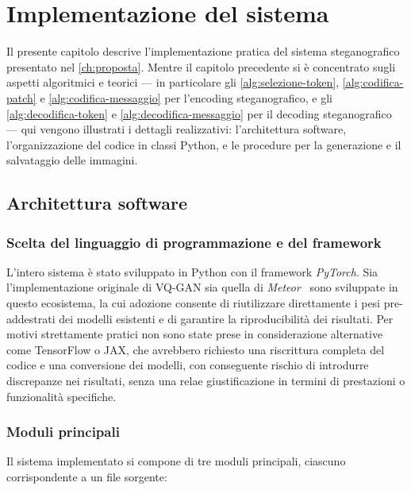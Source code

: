 
\chapter{Implementazione del sistema}
\label{ch:implementazione}

Il presente capitolo descrive l'implementazione pratica del sistema steganografico presentato nel \autoref{ch:proposta}. Mentre il capitolo precedente si è concentrato sugli aspetti algoritmici e teorici — in particolare gli \autoref{alg:selezione-token}, \ref{alg:codifica-patch} e \ref{alg:codifica-messaggio} per l'encoding steganografico, e gli \autoref{alg:decodifica-token} e \ref{alg:decodifica-messaggio} per il decoding steganografico — qui vengono illustrati i dettagli realizzativi: l'architettura software, l'organizzazione del codice in classi Python, e le procedure per la generazione e il salvataggio delle immagini.

\section{Architettura software}
\label{sec:architettura-software}

\subsection{Scelta del linguaggio di programmazione e del framework}

L'intero sistema è stato sviluppato in Python con il framework \emph{PyTorch}. Sia l'implementazione originale di VQ-GAN \cite{esser-2020} sia quella di \emph{Meteor}~\cite{kaptchuk-2021} sono sviluppate in questo ecosistema, la cui adozione consente di riutilizzare direttamente i pesi pre-addestrati dei modelli esistenti e di garantire la riproducibilità dei risultati. Per motivi strettamente pratici non sono state prese in considerazione alternative come TensorFlow o JAX, che avrebbero richiesto una riscrittura completa del codice e una conversione dei modelli, con conseguente rischio di introdurre discrepanze nei risultati, senza una relae giustificazione in termini di prestazioni o funzionalità specifiche.

\subsection{Moduli principali}

Il sistema implementato si compone di tre moduli principali, ciascuno corrispondente a un file sorgente:

